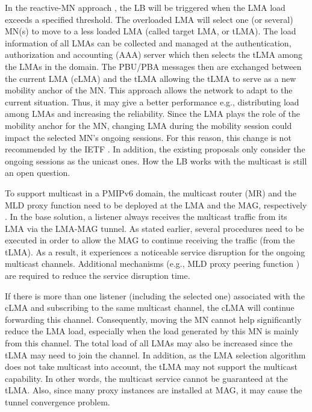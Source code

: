 In the reactive-MN approach \cite{lb_lma,lb_mobility_session}, the LB will be triggered when the LMA load exceeds a specified threshold. The overloaded LMA will select one (or several) MN(s) to move to a less loaded LMA (called target LMA, or tLMA). The load information of all LMAs can be collected and managed at the authentication, authorization and accounting (AAA) server which then selects the tLMA among the LMAs in the domain. The PBU/PBA messages then are exchanged between the current LMA (cLMA) and the tLMA allowing the tLMA to serve as a new mobility anchor of the MN. This approach allows the network to adapt to the current situation. Thus, it may give a better performance e.g., distributing load among LMAs and increasing the reliability. Since the LMA plays the role of the mobility anchor for the MN, changing LMA during the mobility session could impact the selected MN’s ongoing sessions. For this reason, this change is not recommended by the IETF \cite{runtime_lma,lma_discovery}. In addition, the existing proposals only consider the ongoing sessions as the unicast ones. How the LB works with the multicast is still an open question.
 
To support multicast in a PMIPv6 domain, the multicast router (MR) and the MLD proxy function need to be deployed at the LMA and the MAG, respectively \cite{RFC_6224}. In the base solution, a listener always receives the multicast traffic from its LMA via the LMA-MAG tunnel. As stated earlier, several procedures need to be executed in order to allow the MAG to continue receiving the traffic (from the tLMA). As a result, it experiences a noticeable service disruption for the ongoing multicast channels. Additional mechanisms (e.g., MLD proxy peering function \cite{multicast_source}) are required to reduce the service disruption time. 

If there is more than one listener (including the selected one) associated with the cLMA and subscribing to the same multicast channel, the cLMA will continue forwarding this channel. Consequently, moving the MN cannot help significantly reduce the LMA load, especially when the load generated by this MN is mainly from this channel. The total load of all LMAs may also be increased since the tLMA may need to join the channel. In addition, as the LMA selection algorithm does not take multicast into account, the tLMA may not support the multicast capability. In other words, the multicast service cannot be guaranteed at the tLMA. Also, since many proxy instances are installed at MAG, it may cause the tunnel convergence problem.   

